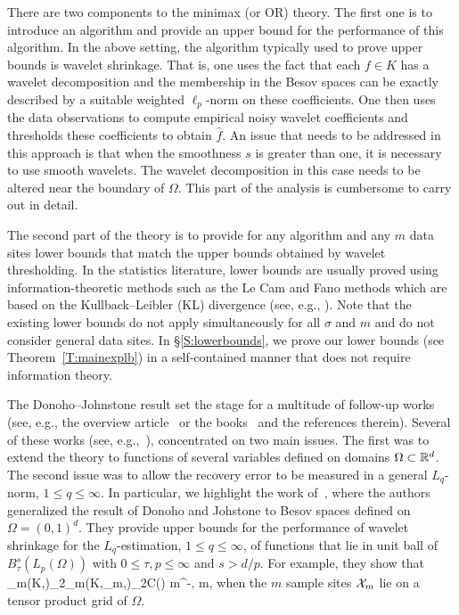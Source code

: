 There are two components to the minimax (or OR) theory. The first one is to introduce  an algorithm and provide an upper bound for the performance of this algorithm.
In the above setting, the algorithm typically used to prove upper bounds is wavelet shrinkage.  That is, one uses the fact that each $f\in K$ has a wavelet decomposition and the membership in the Besov spaces can be exactly described by a suitable weighted $\ell_p$-norm on these coefficients.  One then uses the data observations to compute
empirical noisy wavelet coefficients and thresholds these coefficients to obtain $\hat f$. An issue that needs to be addressed in this approach is that when the smoothness $s$ is greater than one, it is necessary to use smooth
wavelets.  The wavelet decomposition in this case needs to be altered  near the boundary of $\Omega$.  This part of the analysis is cumbersome to carry out in detail.


The second part of the theory is to provide for any algorithm  and any $m$ data sites lower bounds that match the upper bounds obtained by wavelet thresholding. In the statistics literature, lower bounds are usually proved using information-theoretic methods such as the Le Cam and Fano methods which are based on the Kullback--Leibler (KL) divergence (see, e.g.,  \cite{barron1999risk,yang1999information,AN,DJ,DeJu}). 
Note that  the existing lower bounds do not apply simultaneously for all $\sigma$ and $m$ and  do not consider general data sites. In \S\ref{S:lowerbounds}, we prove our lower bounds (see Theorem~\ref{T:mainexplb}) in a self-contained manner that does not require information theory.





The Donoho--Johnstone result set the stage for a multitude of follow-up works (see, e.g., the overview article~\cite{maxiset} or the books~\cite{hardle2012wavelets,gine2016mathematical} and the references therein). 
 Several of these works (see, e.g.,~\cite{donoho1994ideal,DJ,DJKP,DeJu,maxiset,chambolle1998nonlinear,johnstone1999wavelets,MinimaxMaxiset,donoho1996density,hardle2012wavelets}),  concentrated on two main issues.  The first was to extend the theory to functions of several variables defined on domains $\Omega\subset \mathbb{R}^d$. The second issue  was to allow the recovery error to be measured in a general $L_q$-norm, $1\le q\le \infty$. 
 In particular, we highlight the work of~\cite{DeJu}, where  the authors generalized the result of Donoho and Johstone to Besov spaces defined on $\Omega=(0,1)^d$. They provide upper bounds for the performance of    wavelet shrinkage   for the $L_q$-estimation, $1\le q\le \infty$, of functions that lie in unit ball of $B_\tau^s(L_p(\Omega))$ with $0 \leq \tau, p \leq \infty$ and $s > d/p$.   For example, they show that  
 \be \label{DJminimaxupper}
\cR_m(K,\sigma)_2\le \cR_m(K,\cX_m,\sigma)_2\le C(\sigma)  m^{-}, \quad m,
\ee
 when the $m$  sample sites ${\cal X}_m$ lie on a tensor product grid of $\Omega$. 


